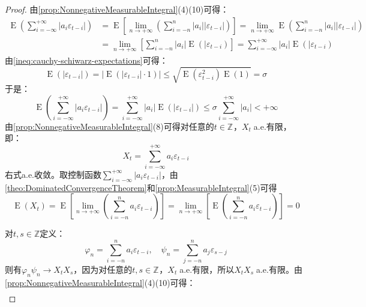 \begin{proof}
	由\cref{prop:NonnegativeMeasurableIntegral}(4)(10)可得：
	\begin{align*}
		\operatorname{E}\left(\sum_{i=-\infty}^{+\infty}|a_i\varepsilon_{t-i}|\right)&=\operatorname{E}\left[\lim_{n\to+\infty}\left(\sum_{i=-n}^{n}|a_i||\varepsilon_{t-i}|\right)\right]=\lim_{n\to+\infty}\operatorname{E}\left(\sum_{i=-n}^{n}|a_i||\varepsilon_{t-i}|\right) \\
		&=\lim_{n\to+\infty}\left[\sum_{i=-n}^{n}|a_i|\operatorname{E}(|\varepsilon_{t-i})\right]=\sum_{i=-\infty}^{+\infty}|a_i|\operatorname{E}(|\varepsilon_{t-i})
	\end{align*}
	由\cref{ineq:cauchy-schiwarz-expectations}可得：
	\begin{equation*}
		\operatorname{E}(|\varepsilon_{t-i}|)=\Big|\operatorname{E}(|\varepsilon_{t-i}|\cdot1)\Big|\leqslant\sqrt{\operatorname{E}(\varepsilon_{t-i}^2)\operatorname{E}(1)}=\sigma
	\end{equation*}
	于是：
	\begin{equation*}
		\operatorname{E}\left(\sum_{i=-\infty}^{+\infty}|a_i\varepsilon_{t-i}|\right)=\sum_{i=-\infty}^{+\infty}|a_i|\operatorname{E}(|\varepsilon_{t-i}|)\leqslant\sigma\sum_{i=-\infty}^{+\infty}|a_i|<+\infty
	\end{equation*}
	由\cref{prop:NonnegativeMeasurableIntegral}(8)可得对任意的$t\in\mathbb{Z}^{}$，$X_t\;$a.e.有限，即：
	\begin{equation*}
		X_t=\sum_{i=-\infty}^{+\infty}a_i\varepsilon_{t-i}
	\end{equation*}
	右式a.e.收敛。取控制函数$\sum\limits_{i=-\infty}^{+\infty}|a_i\varepsilon_{t-i}|$，由\cref{theo:DominatedConvergenceTheorem}和\cref{prop:MeasurableIntegral}(5)可得
	\begin{equation*}
		\operatorname{E}(X_t)=\operatorname{E}\left[\lim_{n\to+\infty}\left(\sum_{i=-n}^{n}a_i\varepsilon_{t-i}\right)\right]=\lim_{n\to+\infty}\left[\operatorname{E}\left(\sum_{i=-n}^{n}a_i\varepsilon_{t-i}\right)\right]=0
	\end{equation*}\par
	对$t,s\in\mathbb{Z}$定义：
	\begin{equation*}
		\varphi_n=\sum_{i=-n}^{n}a_i\varepsilon_{t-i},\quad\psi_n=\sum_{j=-n}^{n}a_j\varepsilon_{s-j}
	\end{equation*}
	则有$\varphi_n\psi_n\to X_tX_s$，因为对任意的$t,s\in\mathbb{Z}^{}$，$X_t\;$a.e.有限，所以$X_tX_s\;$a.e.有限。由\cref{prop:NonnegativeMeasurableIntegral}(4)(10)可得：
	\begin{align*}

\end{align*}
\end{proof}
